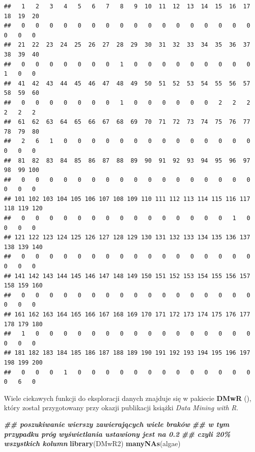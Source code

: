 \documentclass[
]{book}
\newenvironment{Shaded}{\begin{snugshade}}{\end{snugshade}}
\newcommand{\DocumentationTok}[1]{\textcolor[rgb]{0.56,0.35,0.01}{\textbf{\textit{#1}}}}
\newcommand{\FunctionTok}[1]{\textcolor[rgb]{0.13,0.29,0.53}{\textbf{#1}}}
\newcommand{\NormalTok}[1]{#1}
\theoremstyle{plain}
\theoremstyle{definition}
\theoremstyle{definition}
\theoremstyle{definition}
\theoremstyle{definition}
\theoremstyle{definition}
\theoremstyle{remark}
\begin{document}
\begin{verbatim}
##   1   2   3   4   5   6   7   8   9  10  11  12  13  14  15  16  17  18  19  20 
##   0   0   0   0   0   0   0   0   0   0   0   0   0   0   0   0   0   0   0   0 
##  21  22  23  24  25  26  27  28  29  30  31  32  33  34  35  36  37  38  39  40 
##   0   0   0   0   0   0   0   1   0   0   0   0   0   0   0   0   0   1   0   0 
##  41  42  43  44  45  46  47  48  49  50  51  52  53  54  55  56  57  58  59  60 
##   0   0   0   0   0   0   0   1   0   0   0   0   0   0   2   2   2   2   2   2 
##  61  62  63  64  65  66  67  68  69  70  71  72  73  74  75  76  77  78  79  80 
##   2   6   1   0   0   0   0   0   0   0   0   0   0   0   0   0   0   0   0   0 
##  81  82  83  84  85  86  87  88  89  90  91  92  93  94  95  96  97  98  99 100 
##   0   0   0   0   0   0   0   0   0   0   0   0   0   0   0   0   0   0   0   0 
## 101 102 103 104 105 106 107 108 109 110 111 112 113 114 115 116 117 118 119 120 
##   0   0   0   0   0   0   0   0   0   0   0   0   0   0   0   1   0   0   0   0 
## 121 122 123 124 125 126 127 128 129 130 131 132 133 134 135 136 137 138 139 140 
##   0   0   0   0   0   0   0   0   0   0   0   0   0   0   0   0   0   0   0   0 
## 141 142 143 144 145 146 147 148 149 150 151 152 153 154 155 156 157 158 159 160 
##   0   0   0   0   0   0   0   0   0   0   0   0   0   0   0   0   0   0   0   0 
## 161 162 163 164 165 166 167 168 169 170 171 172 173 174 175 176 177 178 179 180 
##   1   0   0   0   0   0   0   0   0   0   0   0   0   0   0   0   0   0   0   0 
## 181 182 183 184 185 186 187 188 189 190 191 192 193 194 195 196 197 198 199 200 
##   0   0   0   1   0   0   0   0   0   0   0   0   0   0   0   0   0   0   6   0
\end{verbatim}

Wiele ciekawych funkcji do eksploracji danych znajduje się w pakiecie \textbf{DMwR} (), który został przygotowany przy okazji publikacji książki \emph{Data Mining with R}.

\begin{Shaded}
\begin{Highlighting}[]
\DocumentationTok{\#\# poszukiwanie wierszy zawierających wiele braków}
\DocumentationTok{\#\# w tym przypadku próg wyświetlania ustawiony jest na 0.2}
\DocumentationTok{\#\# czyli 20\% wszystkich kolumn}
\FunctionTok{library}\NormalTok{(DMwR2)}
\FunctionTok{manyNAs}\NormalTok{(algae)}
\end{Highlighting}
\end{Shaded}
\end{document}
